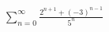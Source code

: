 \label{sum_n=0^infty(2^(n+1)+(-3)^(n-1))/5^n}
$\displaystyle
\sum_{n=0}^\infty \frac{2^{n+1}+(-3)^{n-1}}{5^n}
$

